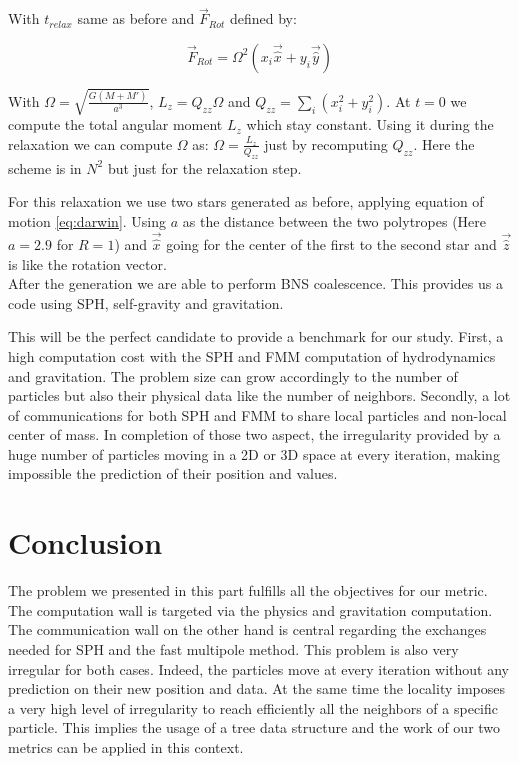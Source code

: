 With $t_{relax}$ same as before and $\vec{F}_{Rot}$ defined by:

\begin{equation}
\vec{F}_{Rot} = \Omega^2(x_i \vec{\hat{x}}+y_i\vec{\hat{y}})
\end{equation}

With $\Omega = \sqrt{\frac{G(M+M')}{a^3}}$, $L_z = Q_{zz}\Omega$ and $Q_{zz} = \sum_i(x_i^2+y_i^2)$. At $t=0$ we compute the total angular moment $L_z$ which stay constant.
Using it during the relaxation we can compute $\Omega$ as: $\Omega = \frac{L_z}{Q_{zz}}$ just by recomputing $Q_{zz}$.
Here the scheme is in $N^2$ but just for the relaxation step. 

For this relaxation we use two stars generated as before, applying equation of motion \ref{eq:darwin}.
Using $a$ as the distance between the two polytropes  (Here $a=2.9$ for $R=1$) and $\vec{\hat{x}}$ going for the center of the first to the second star and $\vec{\hat{z}}$ is like the rotation vector.\\

After the generation we are able to perform BNS coalescence. 
This provides us a code using SPH, self-gravity and gravitation. 

This will be the perfect candidate to provide a benchmark for our study.
First, a high computation cost with the SPH and FMM computation of hydrodynamics and gravitation. 
The problem size can grow accordingly to the number of particles but also their physical data like the number of neighbors. 
Secondly, a lot of communications for both SPH and FMM to share local particles and non-local center of mass. 
In completion of those two aspect, the irregularity provided by a huge number of particles moving in a 2D or 3D space at every iteration, making impossible the prediction of their position and values. 

\section{Conclusion}
The problem we presented in this part fulfills all the objectives for our metric. 
The computation wall is targeted via the physics and gravitation computation. 
The communication wall on the other hand is central regarding the exchanges needed for SPH and the fast multipole method. 
This problem is also very irregular for both cases. 
Indeed, the particles move at every iteration without any prediction on their new position and data. 
At the same time the locality imposes a very high level of irregularity to reach efficiently all the neighbors of a specific particle. 
This implies the usage of a tree data structure and the work of our two metrics can be applied in this context. 

